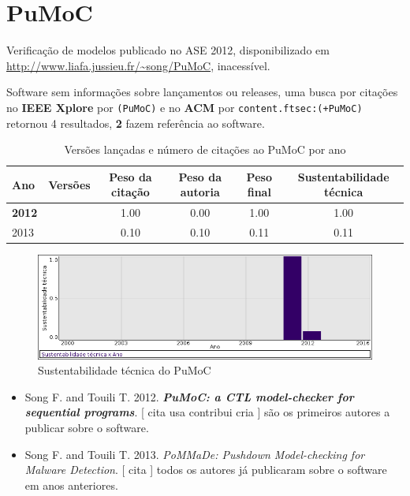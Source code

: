 \section{PuMoC}

Verificação de modelos
publicado no ASE 2012,
disponibilizado em \url{http://www.liafa.jussieu.fr/~song/PuMoC},
inacessível.

Software sem informações sobre lançamentos ou releases,
uma busca por citações no {\bf IEEE Xplore} por
\texttt{(PuMoC)}
e no {\bf ACM} por
\texttt{content.ftsec:(+PuMoC)}
retornou
4 resultados,
{\bf 2} fazem referência ao software.


\begin{table}[H]
\caption{Versões lançadas e número de citações ao PuMoC por ano}
\centering
\begin{tabular}{| l | c | c | c | c | c |}
  \hline
  Ano & Versões & Peso da citação & Peso da autoria & Peso final & Sustentabilidade técnica \\
  \hline
            {\bf 2012}
          &
          
          &
          1.00
          &
          0.00
          &
          1.00
          &
            {\color{blue} 1.00}
          \\
\hline
            2013
          &
          
          &
          0.10
          &
          0.10
          &
          0.11
          &
            {\color{red} 0.11}
          \\
\hline
\end{tabular}
\end{table}

\begin{figure}[h]
  \center
  \includegraphics[scale=0.50]{imagens/softwares-charts/pumoc.png}
  \caption{Sustentabilidade técnica do PuMoC}
\end{figure}


\begin{itemize}
\item Song F. and Touili T.
      2012.
        \textbf{\textit{ PuMoC: a CTL model-checker for sequential programs}}.
      [
          cita
          usa
          contribui
          cria
      ]
são os primeiros autores a publicar sobre o software.
\item Song F. and Touili T.
      2013.
        \textit{ PoMMaDe: Pushdown Model-checking for Malware Detection}.
      [
          cita
      ]
todos os autores já publicaram sobre o software em anos anteriores.
\end{itemize}
